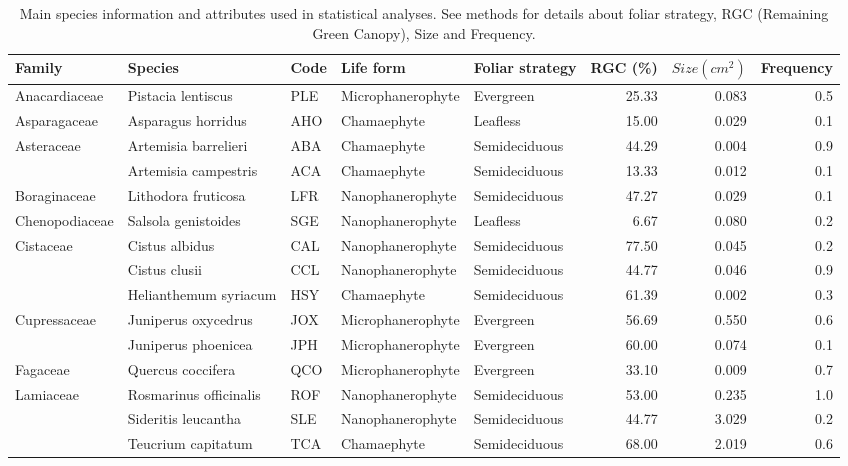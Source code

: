 \documentclass[11pt,twoside]{reedthesis}
\begin{document}
\begin{landscape}\begin{table}[H]

\caption[Main species information and attributes used in statistical analyses]{\label{tab:unnamed-chunk-2}Main species information and attributes used in statistical analyses. See methods for details about foliar strategy, RGC (Remaining Green Canopy), Size and Frequency.}
\centering
\fontsize{7}{9}\selectfont
\begin{tabular}[t]{lllllrrr}
\toprule
Family & Species & Code & Life form & Foliar strategy & RGC (\%) & $Size (cm^2)$ & Frequency\\
\midrule
Anacardiaceae & Pistacia lentiscus & PLE & Microphanerophyte & Evergreen & 25.33 & 0.083 & 0.5\\
Asparagaceae & Asparagus horridus & AHO & Chamaephyte & Leafless & 15.00 & 0.029 & 0.1\\
Asteraceae & Artemisia barrelieri & ABA & Chamaephyte & Semideciduous & 44.29 & 0.004 & 0.9\\
 & Artemisia campestris & ACA & Chamaephyte & Semideciduous & 13.33 & 0.012 & 0.1\\
Boraginaceae & Lithodora fruticosa & LFR & Nanophanerophyte & Semideciduous & 47.27 & 0.029 & 0.1\\
Chenopodiaceae & Salsola genistoides & SGE & Nanophanerophyte & Leafless & 6.67 & 0.080 & 0.2\\
Cistaceae & Cistus albidus & CAL & Nanophanerophyte & Semideciduous & 77.50 & 0.045 & 0.2\\
 & Cistus clusii & CCL & Nanophanerophyte & Semideciduous & 44.77 & 0.046 & 0.9\\
 & Helianthemum syriacum & HSY & Chamaephyte & Semideciduous & 61.39 & 0.002 & 0.3\\
Cupressaceae & Juniperus oxycedrus & JOX & Microphanerophyte & Evergreen & 56.69 & 0.550 & 0.6\\
 & Juniperus phoenicea & JPH & Microphanerophyte & Evergreen & 60.00 & 0.074 & 0.1\\
Fagaceae & Quercus coccifera & QCO & Microphanerophyte & Evergreen & 33.10 & 0.009 & 0.7\\
Lamiaceae & Rosmarinus officinalis & ROF & Nanophanerophyte & Semideciduous & 53.00 & 0.235 & 1.0\\
 & Sideritis leucantha & SLE & Nanophanerophyte & Semideciduous & 44.77 & 3.029 & 0.2\\
 & Teucrium capitatum & TCA & Chamaephyte & Semideciduous & 68.00 & 2.019 & 0.6\\

\end{tabular}
\end{table}
\end{landscape}
\end{document}
